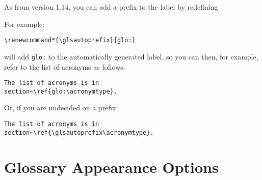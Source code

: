 \documentclass[report]{nlctdoc}
\begin{document}
\begin{description}
As from version 1.14, you can add a prefix to the label by
redefining 
\begin{definition}[\DescribeMacro{\glsautoprefix}]
\end{definition}
For example:
\begin{verbatim}
\renewcommand*{\glsautoprefix}{glo:}
\end{verbatim}
will add \texttt{glo:} to the automatically generated label, so
you can then, for example, refer to the list of acronyms as follows:
\begin{verbatim}
The list of acronyms is in 
section~\ref{glo:\acronymtype}.
\end{verbatim}
Or, if you are undecided on a prefix:
\begin{verbatim}
The list of acronyms is in 
section~\ref{\glsautoprefix\acronymtype}.
\end{verbatim}

\end{description}

\section{Glossary Appearance Options}
\label{sec:pkgopts-printglos}
\end{document}
